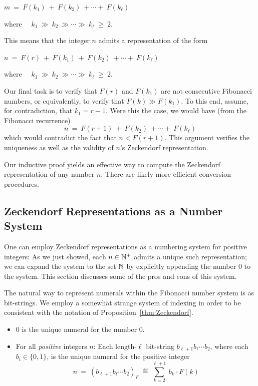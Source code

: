 \hspace*{.25in} $m \ = \ F(k_1) \ + \ F(k_2) \ + \cdots + \ F(k_\ell)$

\smallskip

\noindent
where \ \ $k_1 \ \gg \ k_2 \ \gg \cdots \gg \ k_\ell \ \geq \ 2$.

\noindent
This means that the integer $n$ admits a representation of the form

\hspace*{.25in} $n \ = \ F(r) \ + \ F(k_1) \ + \ F(k_2) \ + \cdots + \ F(k_\ell)$

\smallskip

\noindent
where \ \ $k_1 \ \gg \ k_2 \ \gg \cdots \gg \ k_\ell \ \geq \ 2$.

\smallskip 

Our final task is to verify that $F(r)$ and $F(k_1)$ are not consecutive Fibonacci numbers, or equivalently, to verify that $F(k) \gg F(k_1)$.  To this end, assume, for contradiction, that $k_1=r-1$.  Were this the case, we would have (from the Fibonacci recurrence)
\[ n \ = \ F(r+1) \ + \ F(k_2) \ + \cdots + \ F(k_\ell) \]
which would contradict the fact that $n < F(r+1)$.  This argument verifies the uniqueness as well as the validity of $n$'s Zeckendorf representation.

\medskip

Our inductive proof yields an effective way to compute the Zeckendorf representation of any number $n$.  There are likely more efficient conversion procedures.

\subsection{Zeckendorf Representations as a Number System}
\label{sec:Zeck-rep-number-system}

One can employ Zeckendorf representations as a numbering system for positive integers:  As we just showed, each $n \in \mathbb{N}^+$ admits a unique such representation; we can expand the system to the set $\mathbb{N}$ by explicitly appending the number $0$ to the system.  This section discusses some of the pros and cons of this system.

\smallskip

The natural way to represent numerals within the Fibonacci number system is as bit-strings.  We employ a somewhat strange system of indexing in order to be consistent with the notation of Proposition~\ref{thm:Zeckendorf}.
\begin{itemize}
\item
$0$ is the unique numeral for the number $0$.
\item
For all {\em positive} integers $n$: Each length-$\ell$ bit-string $b_{\ell+1} b_{\ell} \cdots b_2$, where each $b_i \in \{0,1\}$, is the unique numeral for the positive integer
\[ n \ = \ (b_{\ell+1} b_\ell \cdots b_2)_F \ \eqdef \  \sum_{k=2}^{\ell+1} \ b_k \cdot F(k) \]
\end{itemize}

